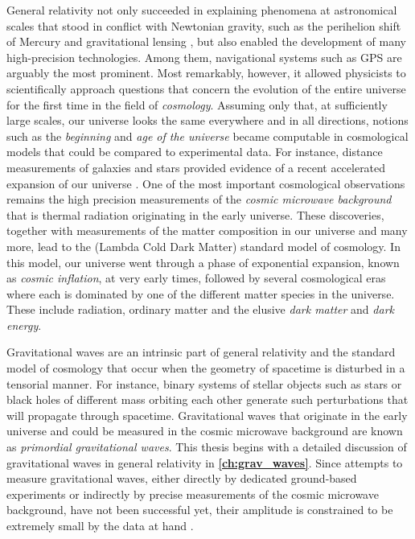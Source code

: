 \documentclass[12pt,parskip=half]{scrreprt}
\newcommand{\addref}{\todo[color=black!20]{ref.}}
\begin{document}
General relativity not only succeeded in explaining phenomena at astronomical scales that stood in conflict with Newtonian gravity, such as the perihelion shift of Mercury and gravitational lensing \autocite{Einstein1915Astro}, but also enabled the development of many high-precision technologies. Among them, navigational systems such as GPS are arguably the most prominent. Most remarkably, however, it allowed physicists to scientifically approach questions that concern the evolution of the entire universe for the first time in the field of \emph{cosmology}. Assuming only that, at sufficiently large scales, our universe looks the same everywhere and in all directions, notions such as the \emph{beginning} and \emph{age of the universe} became computable in cosmological models that could be compared to experimental data. For instance, distance measurements of galaxies and stars provided evidence of a recent accelerated expansion of our universe \autocite{Perlmutter2003}. One of the most important cosmological observations remains the high precision measurements of the \emph{cosmic microwave background} \autocite{Penzias1965,Planck2015} that is thermal radiation originating in the early universe. These discoveries, together with measurements of the matter composition in our universe and many more,  lead to the \LCDM (Lambda Cold Dark Matter) standard model of cosmology. \addref In this model, our universe went through a phase of exponential expansion, known as \emph{cosmic inflation}, at very early times, followed by several cosmological eras where each is dominated by one of the different matter species in the universe. These include radiation, ordinary matter and the elusive \emph{dark matter} and \emph{dark energy}.

Gravitational waves are an intrinsic part of general relativity and the standard model of cosmology that occur when the geometry of spacetime is disturbed in a tensorial manner. For instance, binary systems of stellar objects such as stars or black holes of different mass orbiting each other generate such perturbations that will propagate through spacetime.  Gravitational waves that originate in the early universe and could be measured in the cosmic microwave background are known as \emph{primordial gravitational waves}. This thesis begins with a detailed discussion of gravitational waves in general relativity in \textbf{\autoref{ch:grav_waves}}. Since attempts to measure gravitational waves, either directly by dedicated ground-based experiments or indirectly by precise measurements of the cosmic microwave background, have not been successful yet, their amplitude is constrained to be extremely small by the data at hand \autocite{LIGO2009,Planck2015}.
\end{document}
